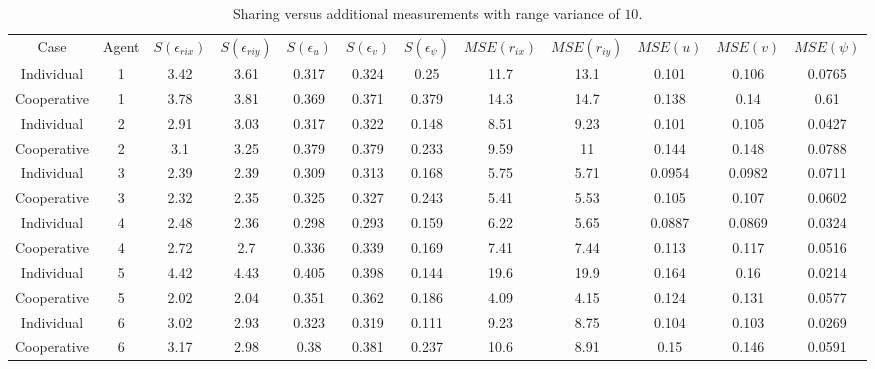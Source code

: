 \documentclass{aiaa-tc}
\begin{document}
\begin{table}[tb!]
\scriptsize
\centering
\begin{tabular}{c|c|c|c|c|c|c|c|c|c|c|c|}
Case & Agent & $S(\epsilon_{rix})$ & $S(\epsilon_{riy})$ & $S(\epsilon_{u})$ & $S(\epsilon_{v})$ & $S(\epsilon_{\psi})$ & $MSE(r_{ix})$ & $MSE(r_{iy})$ & $MSE(u)$ & $MSE(v)$ & $MSE(\psi)$ \\
Individual & 1& 3.42& 3.61& 0.317& 0.324& 0.25& 11.7& 13.1& 0.101& 0.106& 0.0765 \\
Cooperative & 1& 3.78& 3.81& 0.369& 0.371& 0.379& 14.3& 14.7& 0.138& 0.14& 0.61 \\
Individual & 2& 2.91& 3.03& 0.317& 0.322& 0.148& 8.51& 9.23& 0.101& 0.105& 0.0427 \\
Cooperative & 2& 3.1& 3.25& 0.379& 0.379& 0.233& 9.59& 11& 0.144& 0.148& 0.0788 \\
Individual & 3& 2.39& 2.39& 0.309& 0.313& 0.168& 5.75& 5.71& 0.0954& 0.0982& 0.0711 \\
Cooperative & 3& 2.32& 2.35& 0.325& 0.327& 0.243& 5.41& 5.53& 0.105& 0.107& 0.0602 \\
Individual & 4& 2.48& 2.36& 0.298& 0.293& 0.159& 6.22& 5.65& 0.0887& 0.0869& 0.0324 \\
Cooperative & 4& 2.72& 2.7& 0.336& 0.339& 0.169& 7.41& 7.44& 0.113& 0.117& 0.0516 \\
Individual & 5& 4.42& 4.43& 0.405& 0.398& 0.144& 19.6& 19.9& 0.164& 0.16& 0.0214 \\
Cooperative & 5& 2.02& 2.04& 0.351& 0.362& 0.186& 4.09& 4.15& 0.124& 0.131& 0.0577 \\
Individual & 6& 3.02& 2.93& 0.323& 0.319& 0.111& 9.23& 8.75& 0.104& 0.103& 0.0269 \\
Cooperative & 6& 3.17& 2.98& 0.38& 0.381& 0.237& 10.6& 8.91& 0.15& 0.146& 0.0591 \\
\end{tabular}
\caption{Sharing versus additional measurements with range variance of $10$.}
\label{tab:6x1_worse_var}
\end{table}



\end{document}
